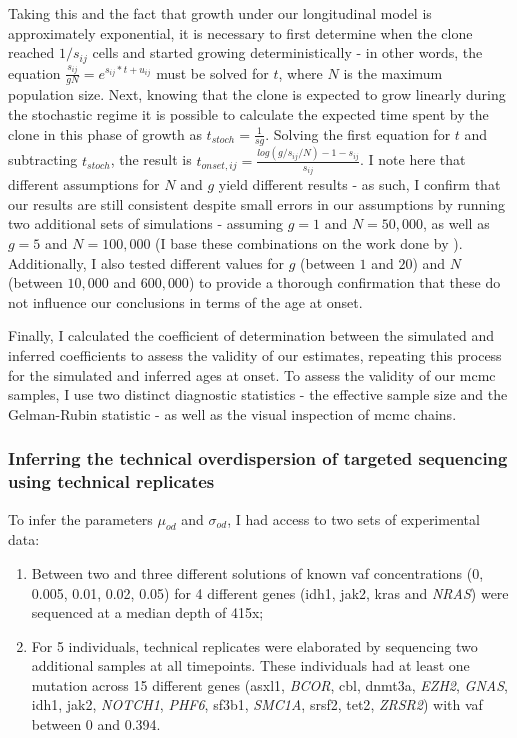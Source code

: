 Taking this and the fact that growth under our longitudinal model is approximately exponential, it is necessary to first determine when the clone reached $1/s_{ij}$ cells and started growing deterministically - in other words, the equation $\frac{s_{ij}}{gN} = e^{s_{ij} * t + u_{ij}}$ must be solved for $t$, where $N$ is the maximum population size. Next, knowing that the clone is expected to grow linearly during the stochastic regime it is possible to calculate the expected time spent by the clone in this phase of growth as $t_{stoch} = \frac{1}{sg}$. Solving the first equation for $t$ and subtracting $t_{stoch}$, the result is $t_{onset,ij} = \frac{log(g/s_{ij}/N)-1-s_{ij}}{s_{ij}}$. I note here that different assumptions for $N$ and $g$ yield different results - as such, I confirm that our results are still consistent despite small errors in our assumptions by running two additional sets of simulations - assuming $g=1$ and $N=50,000$, as well as $g=5$ and $N=100,000$ (I base these combinations on the work done by  \cite{Lee-Six2018-lp}). Additionally, I also tested different values for $g$ (between $1$ and $20$) and $N$ (between $10,000$ and $600,000$) to provide a thorough confirmation that these do not influence our conclusions in terms of the age at onset.

Finally, I calculated the coefficient of determination between the simulated and inferred coefficients to assess the validity of our estimates, repeating this process for the simulated and inferred ages at onset. To assess the validity of our \ac{mcmc} samples, I use two distinct diagnostic statistics - the effective sample size and the Gelman-Rubin statistic \cite{Gelman1992-zo} - as well as the visual inspection of \ac{mcmc} chains.

\subsubsection{Inferring the technical overdispersion of targeted sequencing using technical replicates}

To infer the parameters $\mu_{od}$ and $\sigma_{od}$, I had access to two sets of experimental data:

\begin{enumerate}
	\item Between two and three different solutions of known \ac{vaf} concentrations (0, 0.005, 0.01, 0.02, 0.05) for 4 different genes (\ac{idh1}, \ac{jak2}, \ac{kras} and \textit{NRAS}) were sequenced at a median depth of 415x;
	
	\item For 5 individuals, technical replicates were elaborated by sequencing two additional samples at all timepoints. These individuals had at least one mutation across 15 different genes (\ac{asxl1}, \textit{BCOR}, \ac{cbl}, \ac{dnmt3a}, \textit{EZH2}, \textit{GNAS}, \ac{idh1}, \ac{jak2}, \textit{NOTCH1}, \textit{PHF6}, \ac{sf3b1}, \textit{SMC1A}, \ac{srsf2}, \ac{tet2}, \textit{ZRSR2}) with \ac{vaf} between 0 and 0.394. 
\end{enumerate}


